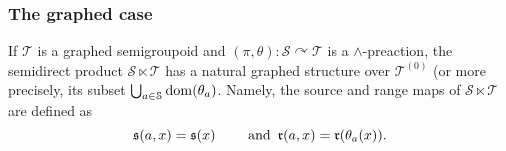 \subsubsection*{The graphed case}

If $\mathcal{T}$ is a graphed semigroupoid and $(\pi,\theta)\colon\mathcal{S}\curvearrowright\mathcal{T}$ is a $\land$-preaction, the semidirect product $\mathcal{S}\ltimes\mathcal{T}$ has a natural graphed structure over $\mathcal{T}^{(0)}$ (or more precisely, its subset $\bigcup_{a\in\mathcal{S}}\operatorname{dom}(\theta_a)$. Namely, the source and range maps of $\mathcal{S}\ltimes\mathcal{T}$ are defined as
\[\operatorname{\mathfrak{s}}(a,x)=\operatorname{\mathfrak{s}}(x)\qquad\text{ and }\operatorname{\mathfrak{r}}(a,x)=\operatorname{\mathfrak{r}}(\theta_a(x)).\]